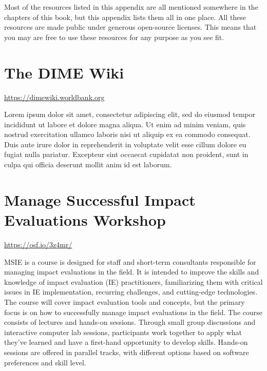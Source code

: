 
\begin{fullwidth}

Most of the resources listed in this appendix are all mentioned somewhere in
the chapters of this book, but this appendix lists them all in one place. All
these resources are made public under generous open-source licenses. This means
that you may are free to use these resources for any purpose as you see fit.

\end{fullwidth}


\filbreak
\section{The DIME Wiki}
\url{https://dimewiki.worldbank.org}
\vspace{\baselineskip}

\noindent Lorem ipsum dolor sit amet, consectetur adipiscing elit, sed do eiusmod tempor incididunt ut labore et dolore magna aliqua. Ut enim ad minim veniam, quis nostrud exercitation ullamco laboris nisi ut aliquip ex ea commodo consequat. Duis aute irure dolor in reprehenderit in voluptate velit esse cillum dolore eu fugiat nulla pariatur. Excepteur sint occaecat cupidatat non proident, sunt in culpa qui officia deserunt mollit anim id est laborum.


\filbreak
\section{Manage Successful Impact Evaluations Workshop}
\url{https://osf.io/3z4mr/}
\vspace{\baselineskip}

\noindent MSIE is a course is designed for staff and short-term consultants responsible for managing impact evaluations in the field. It is intended to improve the skills and knowledge of impact evaluation (IE) practitioners, familiarizing them with critical issues in IE implementation, recurring challenges, and cutting-edge technologies. The course will cover impact evaluation tools and concepts, but the primary focus is on how to successfully manage impact evaluations in the field. The course consists of lectures and hands-on sessions. Through small group discussions and interactive computer lab sessions, participants work together to apply what they’ve learned and have a first-hand opportunity to develop skills. Hands-on sessions are offered in parallel tracks, with different options based on software preferences and skill level.

